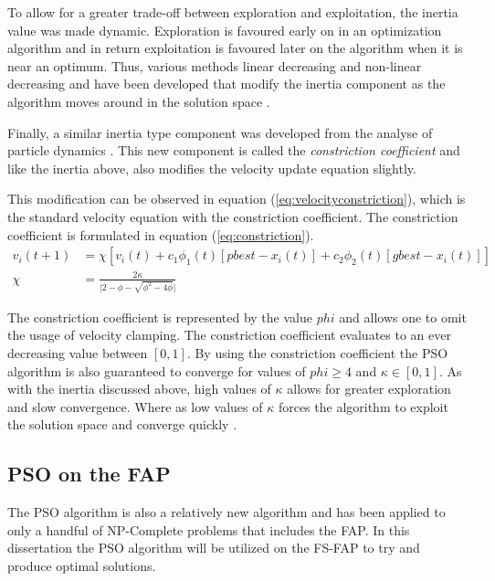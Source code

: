 To allow for a greater trade-off between exploration and exploitation, the inertia value was made dynamic. Exploration is favoured early on in an optimization algorithm and in return exploitation is favoured later on the algorithm when it is near an optimum. Thus, various methods linear decreasing and non-linear decreasing and have been developed that modify the inertia component as the algorithm moves around in the solution space \cite{CompuIntelligenceIntro,FundamentalSwarm}.

Finally, a similar inertia type component was developed from the analyse of particle dynamics \cite{FundamentalSwarm}. This new component is called the \emph{constriction coefficient} and like the inertia above, also modifies the velocity update equation slightly\cite{adaptPSO,FundamentalSwarm,CompuIntelligenceIntro}. 

This modification can be observed in equation (\ref{eq:velocityconstriction}), which is the standard velocity equation with the constriction coefficient. The constriction coefficient is formulated in equation (\ref{eq:constriction})\cite{adaptPSO,FundamentalSwarm,CompuIntelligenceIntro}.
\begin{align}
v_i(t+1) &= \chi[v_i(t) + c_1\phi_{1}(t)[pbest - x_i(t)] + c_2\phi_{2}(t)[gbest - x_i(t)]]\label{eq:velocityconstriction}\\
\chi &= \frac{2\kappa}{\lvert 2 - \phi - \sqrt{\phi^2 - 4\phi}\rvert}\label{eq:constriction}
\end{align}

The constriction coefficient is represented by the value $phi$ and allows one to omit the usage of velocity clamping. The constriction coefficient evaluates to an ever decreasing value between $[0,1]$. By using the constriction coefficient the PSO algorithm is also guaranteed to converge for values of $phi \geq 4$ and $\kappa \in [0,1]$. As with the inertia discussed above, high values of $\kappa$ allows for greater exploration and slow convergence. Where as low values of $\kappa$ forces the algorithm to exploit the solution space and converge quickly \cite{adaptPSO,FundamentalSwarm,CompuIntelligenceIntro}.
\subsection{PSO on the FAP}
\label{sec:psoonfap}
The PSO algorithm is also a relatively new algorithm and has been applied to only a handful of NP-Complete problems that includes the FAP. In this dissertation the PSO algorithm will be utilized on the FS-FAP to try and produce optimal solutions. 

